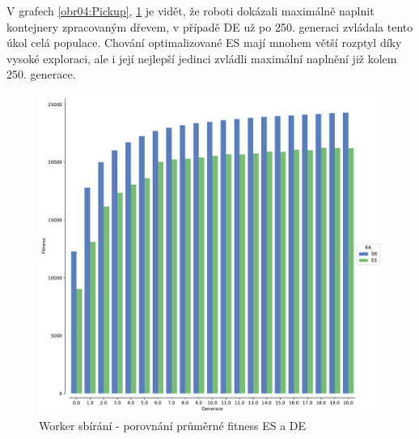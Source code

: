 	V grafech \ref{obr04:Pickup}, \ref{obr04:PickupESvsDE} je vidět, že roboti dokázali maximálně naplnit kontejnery zpracovaným dřevem, v případě DE už po 250. generaci zvládala tento úkol celá populace. Chování optimalizované ES mají mnohem větší rozptyl díky vysoké exploraci, ale i její nejlepší jedinci zvládli maximální naplnění již kolem 250. generace. 
		   \begin{figure}[t]\centering       
		\includegraphics[width=\columnwidth]{../img/WoodMap/DEvsES/WorkerPickUpMem}
		\caption{ Worker sbírání - porovnání průměrné fitness ES a DE}
		\label{obr04:PickupESvsDE}
	\end{figure}

